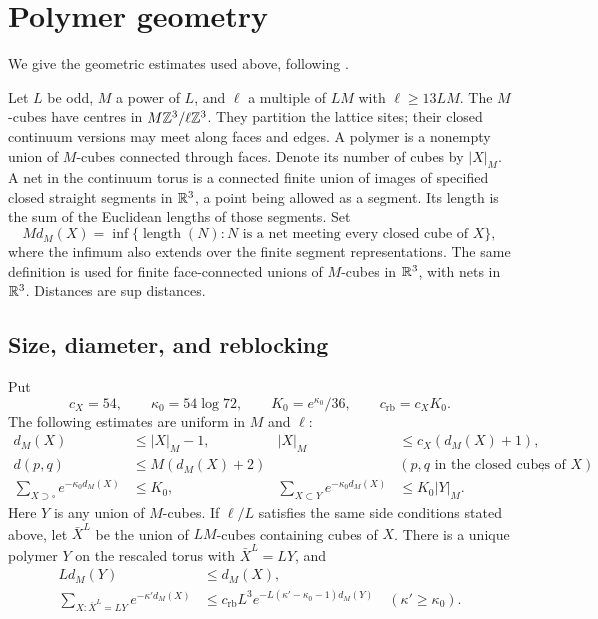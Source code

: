 \section{Polymer geometry}\label{app:polymer-geometry}

We give the geometric estimates used above, following
\cite[Appendix~A]{QED3Manuscript}.

Let $L$ be odd, $M$ a power of $L$, and $\ell$ a multiple of $LM$
with $\ell\ge13LM$. The $M$-cubes have centres in
$M\mathbb Z^3/\ell\mathbb Z^3$. They partition the lattice sites; their closed
continuum versions may meet along faces and edges. A polymer is a
nonempty union of $M$-cubes connected through faces. Denote its number
of cubes by $|X|_M$. A net in the continuum torus is a connected
finite union of images of specified closed straight segments
in $\mathbb R^3$, a point being allowed as a segment.
Its length is the sum of the Euclidean lengths of those segments.
Set
\[
 Md_M(X)=\inf\{\operatorname{length}(N):N
             \text{ is a net meeting every closed cube of }X\},
\]
where the infimum also extends over the finite segment representations.
The same definition is used for finite face-connected unions of
$M$-cubes in $\mathbb R^3$, with nets in $\mathbb R^3$. Distances are sup distances.

\subsection{Size, diameter, and reblocking}

Put
\[
 c_X=54,\qquad \kappa_0=54\log72,\qquad
 K_0=e^{\kappa_0}/36,\qquad c_{\mathrm{rb}}=c_XK_0.
\]
The following estimates are uniform in $M$ and $\ell$:
\begin{align}
 d_M(X)&\le |X|_M-1,&
 |X|_M&\le c_X(d_M(X)+1),\label{eq:polymer-size-tree}\\
 d(p,q)&\le M(d_M(X)+2)
       &&(p,q\text{ in the closed cubes of }X),
                                  \label{eq:polymer-diameter}\\
 \sum_{X\supset\square}e^{-\kappa_0d_M(X)}&\le K_0,&
 \sum_{X\subset Y}e^{-\kappa_0d_M(X)}&\le K_0|Y|_M.
                                  \label{eq:polymer-counting}
\end{align}
Here $Y$ is any union of $M$-cubes. If $\ell/L$ satisfies the same
side conditions stated above, let $\bar X^L$ be the union of $LM$-cubes containing cubes of
$X$. There is a unique polymer $Y$ on the rescaled torus with
$\bar X^L=LY$, and
\begin{align}
 Ld_M(Y)&\le d_M(X),\label{eq:polymer-reblock-tree}\\
 \sum_{X:\bar X^L=LY}e^{-\kappa'd_M(X)}
      &\le c_{\mathrm{rb}}L^3
           e^{-L(\kappa'-\kappa_0-1)d_M(Y)}
                     \quad(\kappa'\ge\kappa_0).
                                  \label{eq:polymer-reblock-sum}
\end{align}

